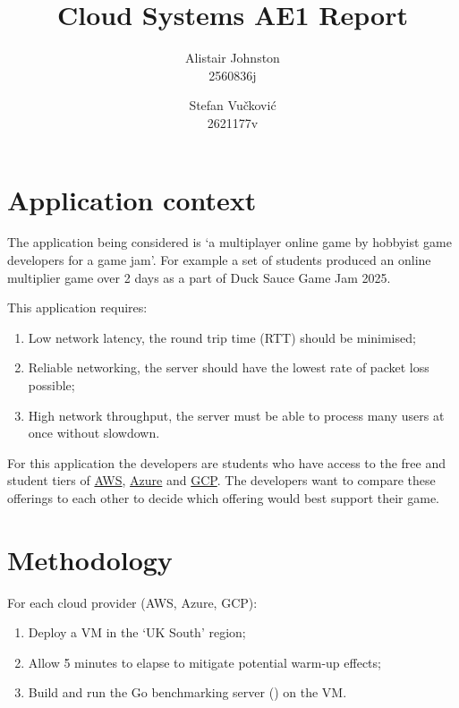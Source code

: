 \documentclass[11pt,a4paper]{article}
\title{Cloud Systems AE1 Report}
\author{
  Alistair Johnston \\  2560836j
  \and
  Stefan Vučković \\ 2621177v
}
\date{{}}
\begin{document}
\flushbottom
\maketitle
\thispagestyle{empty}

\section*{Application context}
The application being considered is `a multiplayer online game by hobbyist game developers for a game jam'. For example a set of students produced an online multiplier game over 2 days as a part of Duck Sauce Game Jam 2025.

This application requires:
\begin{enumerate}
\item{Low network latency, the round trip time (RTT) should be minimised};
\item{Reliable networking, the server should have the lowest rate of packet loss possible};
\item{High network throughput, the server must be able to process many users at once without slowdown}.
\end{enumerate}

For this application the developers are students who have access to the free and student tiers of \href{https://aws.amazon.com/free/}{AWS}, \href{https://azure.microsoft.com/en-us/free/students}{Azure} and \href{https://cloud.google.com/free?hl=en}{GCP}. The developers want to compare these offerings to each other to decide which offering would best support their game.

\section*{Methodology}
For each cloud provider (AWS, Azure, GCP):
\begin{enumerate}
  \item{Deploy a VM in the `UK South' region;}
  \item{Allow 5 minutes to elapse to mitigate potential warm-up effects;}
  \item{Build and run the Go benchmarking server () on the VM.}
\end{enumerate}
\end{document}
